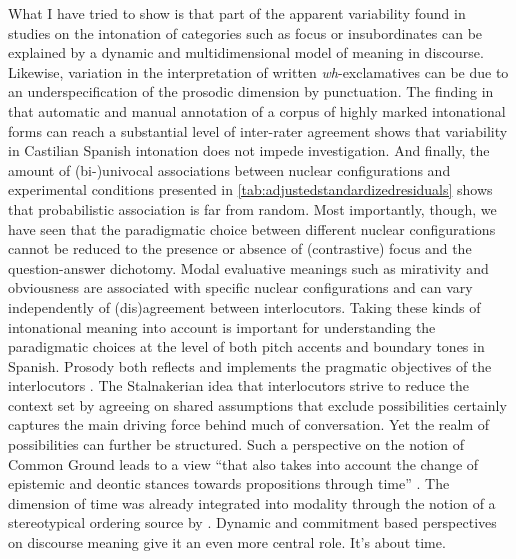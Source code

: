 What I have tried to show is that part of the apparent variability found in studies on the intonation of categories such as focus \citep{Face.2001,Face2002,Face2003,Gabriel2007} or insubordinates \citep{ElviraGarcia.2016} can be explained by a dynamic and multidimensional model of meaning in discourse. Likewise, variation in the interpretation of written \textit{wh}-exclamatives \citep{Grosz.2012} can be due to an underspecification of the prosodic dimension by punctuation. The finding in  that automatic and manual annotation of a corpus of highly marked intonational forms can reach a substantial level of inter-rater agreement shows that variability in Castilian Spanish intonation does not impede investigation. And finally, the amount of (bi-)univocal associations between nuclear configurations and experimental conditions presented in \autoref{tab:adjustedstandardizedresiduals} shows that probabilistic association is far from random. Most importantly, though, we have seen that the paradigmatic choice between different nuclear configurations cannot be reduced to the presence or absence of (contrastive) focus and the question-answer dichotomy. Modal evaluative meanings such as mirativity and obviousness are associated with specific nuclear configurations and can vary independently of (dis)agreement between interlocutors. Taking these kinds of intonational meaning into account is important for understanding the paradigmatic choices at the level of both pitch accents and boundary tones in Spanish. Prosody both reflects and implements the pragmatic objectives of the interlocutors \citep[260]{MartinButragueno.2015}. The Stalnakerian idea that interlocutors strive to reduce the context set by agreeing on shared assumptions that exclude possibilities certainly captures the main driving force behind much of conversation. Yet the realm of possibilities can further be structured. Such a perspective on the notion of Common Ground leads to a view ``that also takes into account the change of epistemic and deontic stances towards propositions through time'' \citep[204]{Reich.2018}. The dimension of time was already integrated into modality through the notion of a stereotypical ordering source by \citet{Kratzer.1981}. Dynamic and commitment based perspectives on discourse meaning give it an even more central role. It's about time.
